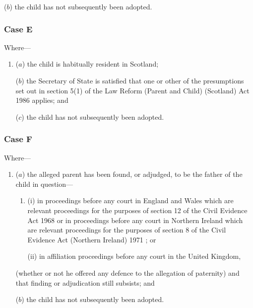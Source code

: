 \documentclass[12pt,a4paper]{article}
\begin{document}
\begin{enumerate}
\begin{enumerate}
    ($b$) 
    the child has not subsequently been adopted.
\end{enumerate}

%
%

    \subsubsection*{Case E}

    Where—
\begin{enumerate}\item[]
    ($a$) 
    the child is habitually resident in Scotland;

    ($b$) 
the Secretary of State  %
is satisfied that one or other of the presumptions set out in section 5(1)  of the Law Reform (Parent and Child) (Scotland) Act 1986 applies; and

    ($c$) 
    the child has not subsequently been adopted.
\end{enumerate}

    \subsubsection*{Case F}

    Where—
\begin{enumerate}\item[]
    ($a$) 
    the alleged parent has been found, or adjudged, to be the father of the child in question—
\begin{enumerate}\item[]
    (i) 
    in proceedings before any court in England and Wales which are relevant proceedings for the purposes of section 12 of the Civil Evidence Act 1968
or in proceedings before any court in Northern Ireland which are relevant proceedings for the purposes of section 8 of the Civil Evidence Act (Northern Ireland) 1971%
; or

    (ii) 
    in affiliation proceedings before any court in the United Kingdom,
\end{enumerate}

    (whether or not he offered any defence to the allegation of paternity) and that finding or adjudication still subsists; and

    ($b$) 
    the child has not subsequently been adopted. 
\end{enumerate}
\end{enumerate}
\end{document}
